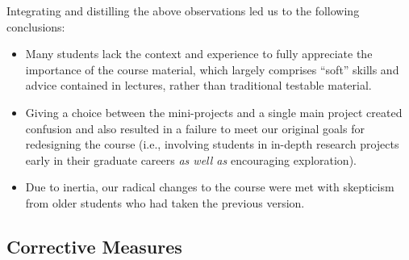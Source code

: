 Integrating and distilling the above observations led us to the
following conclusions:
\begin{itemize}
\itemsep=-1pt
\item Many students lack the context and experience to fully appreciate the
importance of the course material, which largely comprises ``soft''
skills and advice contained in lectures, rather than traditional
testable material.
\item Giving a choice between the mini-projects and a single main project
created confusion and also resulted in a failure to meet our original
goals for redesigning the course (i.e., involving students in in-depth
research projects early in their graduate careers {\em as well as}
encouraging exploration).
\item Due to inertia, our radical changes to the course were met with
  skepticism from older students who had taken the previous version.
\end{itemize}

\subsection{Corrective Measures}

